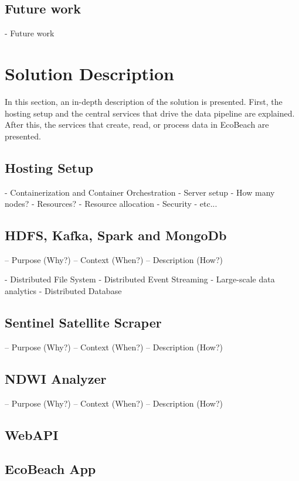 \subsection{Future work}
- Future work

\section{Solution Description}

In this section, an in-depth description of the solution is presented.  First, the hosting setup and the central services that drive the data pipeline are explained. After this, the services that create, read, or process data in EcoBeach are presented.

\subsection{Hosting Setup}

- Containerization and Container Orchestration
- Server setup
    - How many nodes?
    - Resources?
    - Resource allocation
    - Security
    - etc...

\subsection{HDFS, Kafka, Spark and MongoDb}

– Purpose (Why?)
– Context (When?)
– Description (How?)

- Distributed File System
- Distributed Event Streaming
- Large-scale data analytics
- Distributed Database

\subsection{Sentinel Satellite Scraper}

– Purpose (Why?)
– Context (When?)
– Description (How?)

\subsection{NDWI Analyzer}

– Purpose (Why?)
– Context (When?)
– Description (How?)

\subsection{WebAPI}

\subsection{EcoBeach App}





